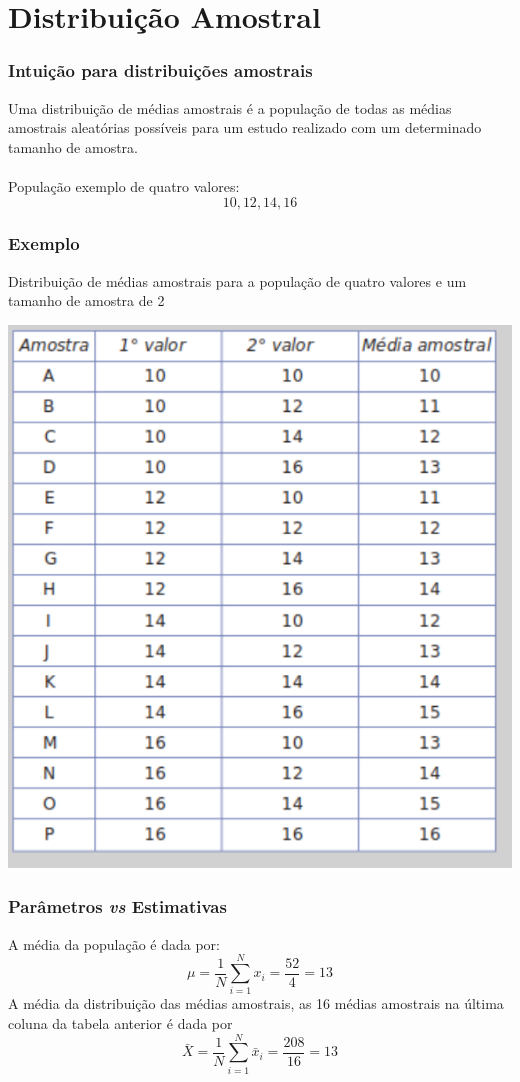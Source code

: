 \documentclass[11pt]{beamer}
\begin{document}
\section{Distribuição Amostral}
\begin{frame}
\frametitle{Intuição para distribuições amostrais}
Uma distribuição de médias amostrais é a população de todas as médias amostrais aleatórias possíveis para um estudo realizado com um determinado tamanho de amostra.\\~\\
População exemplo de quatro valores: \[10, 12, 14, 16\]

\end{frame}

\begin{frame}
\frametitle{Exemplo}
Distribuição de médias amostrais para a população de quatro valores e um tamanho de amostra de 2
\begin{center}\includegraphics[width=0.5\linewidth]{figs/chap5tab5.2} \end{center}
\end{frame}

\begin{frame}
\frametitle{Parâmetros \textit{vs} Estimativas}
A média da população é dada por:
\[\mu=\frac{1}{N}\sum_{i=1}^Nx_i=\frac{52}{4}=13\]
A média da distribuição das médias amostrais, as 16 médias amostrais na última coluna da tabela anterior é dada por
\[\bar{X}=\frac{1}{N}\sum_{i=1}^N\bar{x}_i=\frac{208}{16}=13\]

\end{frame}
\end{document}
